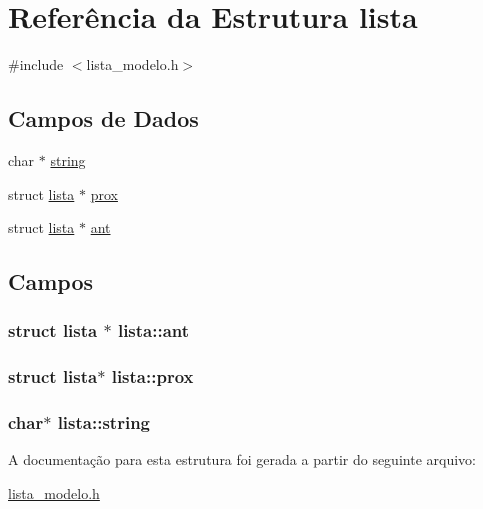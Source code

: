 \hypertarget{structlista}{}\section{Referência da Estrutura lista}
\label{structlista}


{\ttfamily \#include $<$lista\+\_\+modelo.\+h$>$}

\subsection*{Campos de Dados}
\begin{DoxyCompactItemize}
\item 
char $\ast$ \hyperlink{structlista_a1ba5a9f199d6bf09cb40c905d50685f0}{string}
\item 
struct \hyperlink{structlista}{lista} $\ast$ \hyperlink{structlista_a3b0e375147c1163d74544fd206a1f1de}{prox}
\item 
struct \hyperlink{structlista}{lista} $\ast$ \hyperlink{structlista_a92e5a9da9a7788d2a85de746a88b336f}{ant}
\end{DoxyCompactItemize}


\subsection{Campos}
\subsubsection[{\texorpdfstring{ant}{ant}}]{\setlength{\rightskip}{0pt plus 5cm}struct {\bf lista} $\ast$ lista\+::ant}\hypertarget{structlista_a92e5a9da9a7788d2a85de746a88b336f}{}\label{structlista_a92e5a9da9a7788d2a85de746a88b336f}
\subsubsection[{\texorpdfstring{prox}{prox}}]{\setlength{\rightskip}{0pt plus 5cm}struct {\bf lista}$\ast$ lista\+::prox}\hypertarget{structlista_a3b0e375147c1163d74544fd206a1f1de}{}\label{structlista_a3b0e375147c1163d74544fd206a1f1de}
\subsubsection[{\texorpdfstring{string}{string}}]{\setlength{\rightskip}{0pt plus 5cm}char$\ast$ lista\+::string}\hypertarget{structlista_a1ba5a9f199d6bf09cb40c905d50685f0}{}\label{structlista_a1ba5a9f199d6bf09cb40c905d50685f0}


A documentação para esta estrutura foi gerada a partir do seguinte arquivo\+:\begin{DoxyCompactItemize}
\item 
\hyperlink{lista__modelo_8h}{lista\+\_\+modelo.\+h}\end{DoxyCompactItemize}
